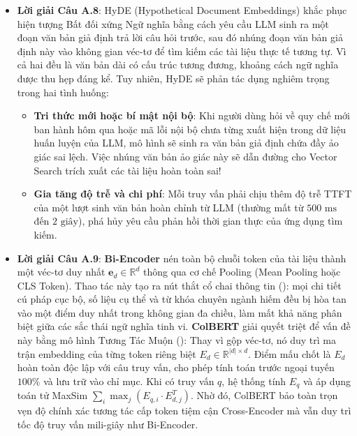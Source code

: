 \begin{itemize}
  \item \textbf{Lời giải Câu A.8}:
  HyDE (Hypothetical Document Embeddings) khắc phục hiện tượng Bất đối xứng Ngữ nghĩa bằng cách yêu cầu LLM sinh ra một đoạn văn bản giả định trả lời câu hỏi trước, sau đó nhúng đoạn văn bản giả định này vào không gian véc-tơ để tìm kiếm các tài liệu thực tế tương tự. Vì cả hai đều là văn bản dài có cấu trúc tương đương, khoảng cách ngữ nghĩa được thu hẹp đáng kể.
  Tuy nhiên, HyDE sẽ phản tác dụng nghiêm trọng trong hai tình huống:
  \begin{itemize}
    \item \textbf{Tri thức mới hoặc bí mật nội bộ}: Khi người dùng hỏi về quy chế mới ban hành hôm qua hoặc mã lỗi nội bộ chưa từng xuất hiện trong dữ liệu huấn luyện của LLM, mô hình sẽ sinh ra văn bản giả định chứa đầy ảo giác sai lệch. Việc nhúng văn bản ảo giác này sẽ dẫn đường cho Vector Search trích xuất các tài liệu hoàn toàn sai!
    \item \textbf{Gia tăng độ trễ và chi phí}: Mỗi truy vấn phải chịu thêm độ trễ TTFT của một lượt sinh văn bản hoàn chỉnh từ LLM (thường mất từ $500\text{ ms}$ đến $2\text{ giây}$), phá hủy yêu cầu phản hồi thời gian thực của ứng dụng tìm kiếm.
  \end{itemize}

  \item \textbf{Lời giải Câu A.9}:
  \textbf{Bi-Encoder} nén toàn bộ chuỗi token của tài liệu thành một véc-tơ duy nhất $\mathbf{e}_d \in \mathbb{R}^d$ thông qua cơ chế Pooling (Mean Pooling hoặc CLS Token). Thao tác này tạo ra nút thắt cổ chai thông tin (): mọi chi tiết cú pháp cục bộ, số liệu cụ thể và từ khóa chuyên ngành hiếm đều bị hòa tan vào một điểm duy nhất trong không gian đa chiều, làm mất khả năng phân biệt giữa các sắc thái ngữ nghĩa tinh vi.
  \textbf{ColBERT} giải quyết triệt để vấn đề này bằng mô hình Tương Tác Muộn (): Thay vì gộp véc-tơ, nó duy trì ma trận embedding của từng token riêng biệt $E_d \in \mathbb{R}^{|d| \times d}$. Điểm mấu chốt là $E_d$ hoàn toàn độc lập với câu truy vấn, cho phép tính toán trước ngoại tuyến $100\%$ và lưu trữ vào chỉ mục. Khi có truy vấn $q$, hệ thống tính $E_q$ và áp dụng toán tử MaxSim $\sum_{i} \max_{j} (E_{q, i} \cdot E_{d, j}^T)$. Nhờ đó, ColBERT bảo toàn trọn vẹn độ chính xác tương tác cấp token tiệm cận Cross-Encoder mà vẫn duy trì tốc độ truy vấn mili-giây như Bi-Encoder.


\end{itemize}
